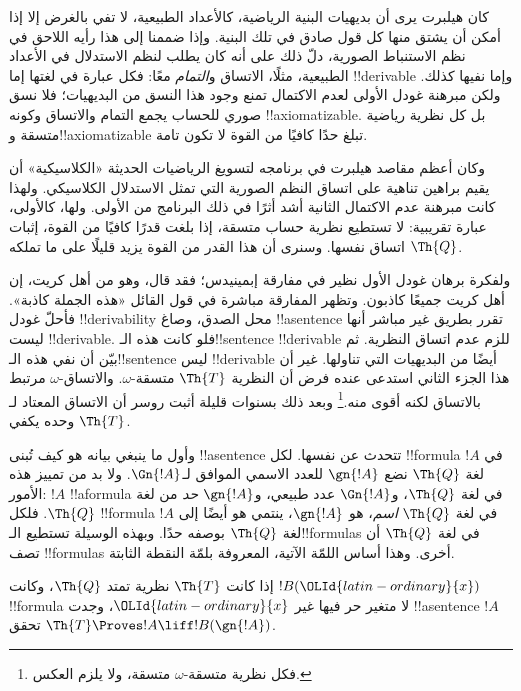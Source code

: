 \documentclass[../../../include/open-logic-section]{subfiles}
\begin{document}


كان هيلبرت يرى أن بديهيات البنية الرياضية، كالأعداد الطبيعية، لا
تفي بالغرض إلا إذا أمكن أن يشتق منها كل قول صادق في تلك البنية.
وإذا ضممنا إلى هذا رأيه اللاحق في نظم الاستنباط الصورية، دلّ ذلك
على أنه كان يطلب لنظم الاستدلال في الأعداد الطبيعية، مثلًا، الاتساق
و\emph{التمام} معًا: فكل عبارة في لغتها إما !!{derivable} وإما
نفيها كذلك. ولكن مبرهنة غودل الأولى لعدم الاكتمال تمنع وجود هذا
النسق من البديهيات؛ فلا نسق صوري للحساب يجمع التمام والاتساق وكونه
!!{axiomatizable}. بل كل نظرية رياضية متسقة و!!{axiomatizable}
تبلغ حدًا كافيًا من القوة لا تكون تامة.

وكان أعظم مقاصد هيلبرت في برنامجه لتسويغ الرياضيات الحديثة
«الكلاسيكية» أن يقيم براهين تناهية على اتساق النظم الصورية التي
تمثل الاستدلال الكلاسيكي. ولهذا كانت مبرهنة عدم الاكتمال الثانية
أشد أثرًا في ذلك البرنامج من الأولى. ولها، كالأولى، عبارة تقريبية:
لا تستطيع نظرية حساب متسقة، إذا بلغت قدرًا كافيًا من القوة، إثبات
اتساق نفسها. وسنرى أن هذا القدر من القوة يزيد قليلًا على
ما تملكه $\Th{Q}$.

ولفكرة برهان غودل الأول نظير في مفارقة إبمينيدس؛ فقد قال، وهو
من أهل كريت، إن أهل كريت جميعًا كاذبون. وتظهر المفارقة مباشرة في
قول القائل «هذه الجملة كاذبة». فأحلّ غودل !!{derivability} محل
الصدق، وصاغ !!a{sentence} تقرر بطريق غير مباشر أنها ليست
!!{derivable}. فلو كانت هذه الـ!!{sentence} !!{derivable} للزم
عدم اتساق النظرية. ثم بيّن أن نفي هذه الـ!!{sentence} ليس
!!{derivable} أيضًا من البديهيات التي تناولها. غير أن هذا الجزء
الثاني استدعى عنده فرض أن النظرية $\Th{T}$ متسقة-$\omega$.
والاتساق-$\omega$ مرتبط بالاتساق لكنه أقوى منه.\footnote{فكل نظرية
متسقة-$\omega$ متسقة، ولا يلزم العكس.} وبعد ذلك بسنوات قليلة أثبت
روسر أن الاتساق المعتاد لـ$\Th{T}$ وحده يكفي.

وأول ما ينبغي بيانه هو كيف تُبنى !!a{sentence} تتحدث عن نفسها.
لكل !!{formula} $!A$ في لغة $\Th{Q}$ نضع $\gn{!A}$ للعدد الاسمي
الموافق لـ$\Gn{!A}$. ولا بد من تمييز هذه الأمور: $!A$
!!a{formula} في لغة $\Th{Q}$، و$\Gn{!A}$ عدد طبيعي،
و$\gn{!A}$ \emph{حد} من لغة $\Th{Q}$. فلكل !!{formula} $!A$
في لغة $\Th{Q}$ \emph{اسم}، هو $\gn{!A}$، ينتمي هو أيضًا إلى
لغة $\Th{Q}$ بوصفه حدًا. وبهذه الوسيلة تستطيع الـ!!{formula}s
في لغة $\Th{Q}$ أن تصف !!{formula}s أخرى. وهذا أساس اللمّة
الآتية، المعروفة بلمّة النقطة الثابتة.

\begin{lem}
إذا كانت $\Th{T}$ نظرية تمتد $\Th{Q}$، وكانت $!B({\OLId{latin-ordinary}{x}})$
!!{formula} لا متغير حر فيها غير ${\OLId{latin-ordinary}{x}}$، وجدت !!a{sentence} $!A$
تحقق $\Th{T}\Proves !A\liff !B(\gn{!A})$.
\end{lem}
\end{document}
